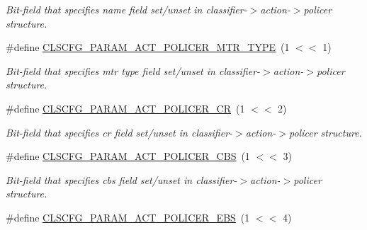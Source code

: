 \begin{DoxyCompactItemize}
\begin{DoxyCompactList}\small\item\em Bit-\/field that specifies name field set/unset in classifier-\/$>$action-\/$>$policer structure. \end{DoxyCompactList}\item 
\hypertarget{group__FAPI__QOS__CLASS_ga7fb0e5f90776eb832dffcd53ec162c6e}{\#define \hyperlink{group__FAPI__QOS__CLASS_ga7fb0e5f90776eb832dffcd53ec162c6e}{C\-L\-S\-C\-F\-G\-\_\-\-P\-A\-R\-A\-M\-\_\-\-A\-C\-T\-\_\-\-P\-O\-L\-I\-C\-E\-R\-\_\-\-M\-T\-R\-\_\-\-T\-Y\-P\-E}~(1 $<$$<$ 1)}\label{group__FAPI__QOS__CLASS_ga7fb0e5f90776eb832dffcd53ec162c6e}

\begin{DoxyCompactList}\small\item\em Bit-\/field that specifies mtr type field set/unset in classifier-\/$>$action-\/$>$policer structure. \end{DoxyCompactList}\item 
\hypertarget{group__FAPI__QOS__CLASS_gacd76a4de3d2d681efd9ef60f3d7c2e01}{\#define \hyperlink{group__FAPI__QOS__CLASS_gacd76a4de3d2d681efd9ef60f3d7c2e01}{C\-L\-S\-C\-F\-G\-\_\-\-P\-A\-R\-A\-M\-\_\-\-A\-C\-T\-\_\-\-P\-O\-L\-I\-C\-E\-R\-\_\-\-C\-R}~(1 $<$$<$ 2)}\label{group__FAPI__QOS__CLASS_gacd76a4de3d2d681efd9ef60f3d7c2e01}

\begin{DoxyCompactList}\small\item\em Bit-\/field that specifies cr field set/unset in classifier-\/$>$action-\/$>$policer structure. \end{DoxyCompactList}\item 
\hypertarget{group__FAPI__QOS__CLASS_gac2a70466a6ce647a37cbf825e763fcba}{\#define \hyperlink{group__FAPI__QOS__CLASS_gac2a70466a6ce647a37cbf825e763fcba}{C\-L\-S\-C\-F\-G\-\_\-\-P\-A\-R\-A\-M\-\_\-\-A\-C\-T\-\_\-\-P\-O\-L\-I\-C\-E\-R\-\_\-\-C\-B\-S}~(1 $<$$<$ 3)}\label{group__FAPI__QOS__CLASS_gac2a70466a6ce647a37cbf825e763fcba}

\begin{DoxyCompactList}\small\item\em Bit-\/field that specifies cbs field set/unset in classifier-\/$>$action-\/$>$policer structure. \end{DoxyCompactList}\item 
\hypertarget{group__FAPI__QOS__CLASS_ga12ae7333fcc141093798d79d9cfd9c58}{\#define \hyperlink{group__FAPI__QOS__CLASS_ga12ae7333fcc141093798d79d9cfd9c58}{C\-L\-S\-C\-F\-G\-\_\-\-P\-A\-R\-A\-M\-\_\-\-A\-C\-T\-\_\-\-P\-O\-L\-I\-C\-E\-R\-\_\-\-E\-B\-S}~(1 $<$$<$ 4)}\label{group__FAPI__QOS__CLASS_ga12ae7333fcc141093798d79d9cfd9c58}


\end{DoxyCompactItemize}
